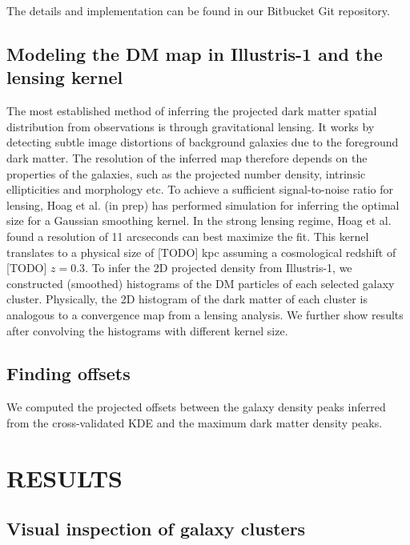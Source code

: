The details and implementation can be found in our Bitbucket Git repository.



\subsection{Modeling the DM map in Illustris-1 and the lensing kernel}
The most established method of inferring the projected dark matter spatial 
distribution from observations is through gravitational lensing.
It works by detecting subtle image distortions of background galaxies due to
the foreground dark matter. The resolution of the inferred map therefore 
depends on the properties of the galaxies, such as the projected number density, 
intrinsic ellipticities and morphology etc.
To achieve a sufficient signal-to-noise ratio for lensing, 
Hoag et al. (in prep) has performed simulation for inferring the optimal size
for a Gaussian smoothing kernel. 
In the strong lensing regime, Hoag et al. found a resolution of 11 arcseconds
can best maximize the fit. This kernel translates to a physical size of [TODO]
kpc assuming a cosmological redshift of [TODO] $z = 0.3$.
To infer the 2D projected density from Illustris-1, 
we constructed (smoothed) histograms of the DM
particles of each selected galaxy cluster. 
Physically, the 2D histogram of the dark matter of each cluster 
is analogous to a convergence map from a lensing analysis. 
We further show results after convolving the histograms with different kernel
size.   




\subsection{Finding offsets} 
We computed the projected offsets between the galaxy density peaks inferred from the
cross-validated KDE and the maximum dark matter density peaks.

\label{sec:results}




\section{RESULTS} 



\subsection{Visual inspection of galaxy clusters}

